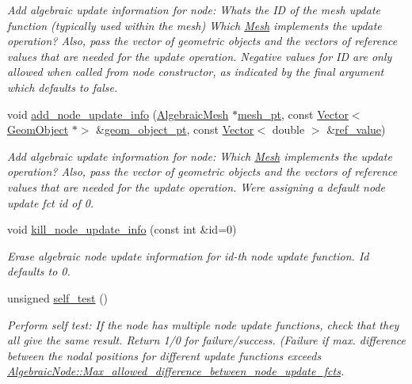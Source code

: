 \begin{DoxyCompactItemize}
\begin{DoxyCompactList}\small\item\em Add algebraic update information for node\+: What\textquotesingle{}s the ID of the mesh update function (typically used within the mesh) Which \hyperlink{classoomph_1_1Mesh}{Mesh} implements the update operation? Also, pass the vector of geometric objects and the vectors of reference values that are needed for the update operation. Negative values for ID are only allowed when called from node constructor, as indicated by the final argument which defaults to false. \end{DoxyCompactList}\item 
void \hyperlink{classoomph_1_1AlgebraicNode_a646b087c73a6b355709369d30081fb4a}{add\+\_\+node\+\_\+update\+\_\+info} (\hyperlink{classoomph_1_1AlgebraicMesh}{Algebraic\+Mesh} $\ast$\hyperlink{classoomph_1_1AlgebraicNode_a929a96691397e1990fdf785dfcea5c07}{mesh\+\_\+pt}, const \hyperlink{classoomph_1_1Vector}{Vector}$<$ \hyperlink{classoomph_1_1GeomObject}{Geom\+Object} $\ast$$>$ \&\hyperlink{classoomph_1_1AlgebraicNode_a6ea1dc01f3b657b5c63d6de2b67ea990}{geom\+\_\+object\+\_\+pt}, const \hyperlink{classoomph_1_1Vector}{Vector}$<$ double $>$ \&\hyperlink{classoomph_1_1AlgebraicNode_a9658be0ccdb312e7cf0175663407f463}{ref\+\_\+value})
\begin{DoxyCompactList}\small\item\em Add algebraic update information for node\+: Which \hyperlink{classoomph_1_1Mesh}{Mesh} implements the update operation? Also, pass the vector of geometric objects and the vectors of reference values that are needed for the update operation. We\textquotesingle{}re assigning a default node update fct id of 0. \end{DoxyCompactList}\item 
void \hyperlink{classoomph_1_1AlgebraicNode_a9de65e71efa3050187d41f05602accfe}{kill\+\_\+node\+\_\+update\+\_\+info} (const int \&id=0)
\begin{DoxyCompactList}\small\item\em Erase algebraic node update information for id-\/th node update function. Id defaults to 0. \end{DoxyCompactList}\item 
unsigned \hyperlink{classoomph_1_1AlgebraicNode_a68b0fc5d9b38bb087f889424382a3ecd}{self\+\_\+test} ()
\begin{DoxyCompactList}\small\item\em Perform self test\+: If the node has multiple node update functions, check that they all give the same result. Return 1/0 for failure/success. (Failure if max. difference between the nodal positions for different update functions exceeds \hyperlink{classoomph_1_1AlgebraicNode_a5696d589c11a229f402d68476c7fe435}{Algebraic\+Node\+::\+Max\+\_\+allowed\+\_\+difference\+\_\+between\+\_\+node\+\_\+update\+\_\+fcts}. \end{DoxyCompactList}\end{DoxyCompactItemize}
